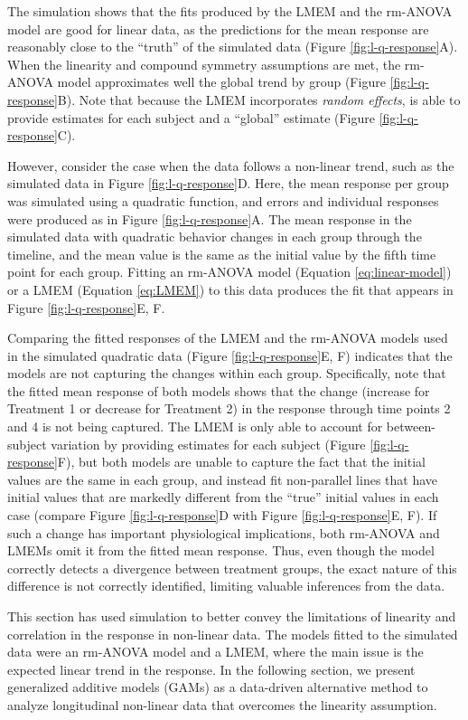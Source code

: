 \documentclass[Royal,times,doublespace,sagev]{sagej}
\begin{document}
The simulation shows that the fits produced by the LMEM and the rm-ANOVA model are good for linear data, as the predictions for the mean response are reasonably close to the ``truth'' of the simulated data (Figure \ref{fig:l-q-response}A). When the linearity and compound symmetry assumptions are met, the rm-ANOVA model approximates well the global trend by group (Figure \ref{fig:l-q-response}B). Note that because the LMEM incorporates \emph{random effects}, is able to provide estimates for each subject and a ``global'' estimate (Figure \ref{fig:l-q-response}C).

However, consider the case when the data follows a non-linear trend, such as the simulated data in Figure \ref{fig:l-q-response}D. Here, the mean response per group was simulated using a quadratic function, and errors and individual responses were produced as in Figure \ref{fig:l-q-response}A. The mean response in the simulated data with quadratic behavior changes in each group through the timeline, and the mean value is the same as the initial value by the fifth time point for each group. Fitting an rm-ANOVA model (Equation \eqref{eq:linear-model}) or a LMEM (Equation \eqref{eq:LMEM}) to this data produces the fit that appears in Figure \ref{fig:l-q-response}E, F.

Comparing the fitted responses of the LMEM and the rm-ANOVA models used in the simulated quadratic data (Figure \ref{fig:l-q-response}E, F) indicates that the models are not capturing the changes within each group. Specifically, note that the fitted mean response of both models shows that the change (increase for Treatment 1 or decrease for Treatment 2) in the response through time points 2 and 4 is not being captured. The LMEM is only able to account for between-subject variation by providing estimates for each subject (Figure \ref{fig:l-q-response}F), but both models are unable to capture the fact that the initial values are the same in each group, and instead fit non-parallel lines that have initial values that are markedly different from the ``true'' initial values in each case (compare Figure \ref{fig:l-q-response}D with Figure \ref{fig:l-q-response}E, F). If such a change has important physiological implications, both rm-ANOVA and LMEMs omit it from the fitted mean response. Thus, even though the model correctly detects a divergence between treatment groups, the exact nature of this difference is not correctly identified, limiting valuable inferences from the data.

This section has used simulation to better convey the limitations of linearity and correlation in the response in non-linear data. The models fitted to the simulated data were an rm-ANOVA model and a LMEM, where the main issue is the expected linear trend in the response. In the following section, we present generalized additive models (GAMs) as a data-driven alternative method to analyze longitudinal non-linear data that overcomes the linearity assumption.
\end{document}
